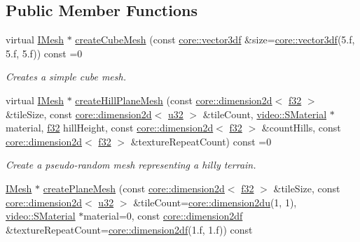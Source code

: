 \subsection*{Public Member Functions}
\begin{DoxyCompactItemize}
\item 
virtual \hyperlink{classirr_1_1scene_1_1IMesh}{I\+Mesh} $\ast$ \hyperlink{classirr_1_1scene_1_1IGeometryCreator_a43a1310362ad8e682c21375b2b9de39b}{create\+Cube\+Mesh} (const \hyperlink{namespaceirr_1_1core_ae6e2b2a6c552833ebbd5b7463d03586b}{core\+::vector3df} \&size=\hyperlink{namespaceirr_1_1core_ae6e2b2a6c552833ebbd5b7463d03586b}{core\+::vector3df}(5.f, 5.f, 5.f)) const =0
\begin{DoxyCompactList}\small\item\em Creates a simple cube mesh. \end{DoxyCompactList}\item 
virtual \hyperlink{classirr_1_1scene_1_1IMesh}{I\+Mesh} $\ast$ \hyperlink{classirr_1_1scene_1_1IGeometryCreator_a85cb5d4271a1ef4ba1706b15f70ae391}{create\+Hill\+Plane\+Mesh} (const \hyperlink{classirr_1_1core_1_1dimension2d}{core\+::dimension2d}$<$ \hyperlink{namespaceirr_a0277be98d67dc26ff93b1a6a1d086b07}{f32} $>$ \&tile\+Size, const \hyperlink{classirr_1_1core_1_1dimension2d}{core\+::dimension2d}$<$ \hyperlink{namespaceirr_a0416a53257075833e7002efd0a18e804}{u32} $>$ \&tile\+Count, \hyperlink{classirr_1_1video_1_1SMaterial}{video\+::\+S\+Material} $\ast$material, \hyperlink{namespaceirr_a0277be98d67dc26ff93b1a6a1d086b07}{f32} hill\+Height, const \hyperlink{classirr_1_1core_1_1dimension2d}{core\+::dimension2d}$<$ \hyperlink{namespaceirr_a0277be98d67dc26ff93b1a6a1d086b07}{f32} $>$ \&count\+Hills, const \hyperlink{classirr_1_1core_1_1dimension2d}{core\+::dimension2d}$<$ \hyperlink{namespaceirr_a0277be98d67dc26ff93b1a6a1d086b07}{f32} $>$ \&texture\+Repeat\+Count) const =0
\begin{DoxyCompactList}\small\item\em Create a pseudo-\/random mesh representing a hilly terrain. \end{DoxyCompactList}\item 
\hyperlink{classirr_1_1scene_1_1IMesh}{I\+Mesh} $\ast$ \hyperlink{classirr_1_1scene_1_1IGeometryCreator_ad584dd294e44104452c4418d70223381}{create\+Plane\+Mesh} (const \hyperlink{classirr_1_1core_1_1dimension2d}{core\+::dimension2d}$<$ \hyperlink{namespaceirr_a0277be98d67dc26ff93b1a6a1d086b07}{f32} $>$ \&tile\+Size, const \hyperlink{classirr_1_1core_1_1dimension2d}{core\+::dimension2d}$<$ \hyperlink{namespaceirr_a0416a53257075833e7002efd0a18e804}{u32} $>$ \&tile\+Count=\hyperlink{namespaceirr_1_1core_a13e5bd7e47b2014eefc870ede11bbbbc}{core\+::dimension2du}(1, 1), \hyperlink{classirr_1_1video_1_1SMaterial}{video\+::\+S\+Material} $\ast$material=0, const \hyperlink{namespaceirr_1_1core_a54f0e5b7416e6dce5a0f6213f00a580f}{core\+::dimension2df} \&texture\+Repeat\+Count=\hyperlink{namespaceirr_1_1core_a54f0e5b7416e6dce5a0f6213f00a580f}{core\+::dimension2df}(1.f, 1.f)) const

\end{DoxyCompactItemize}

